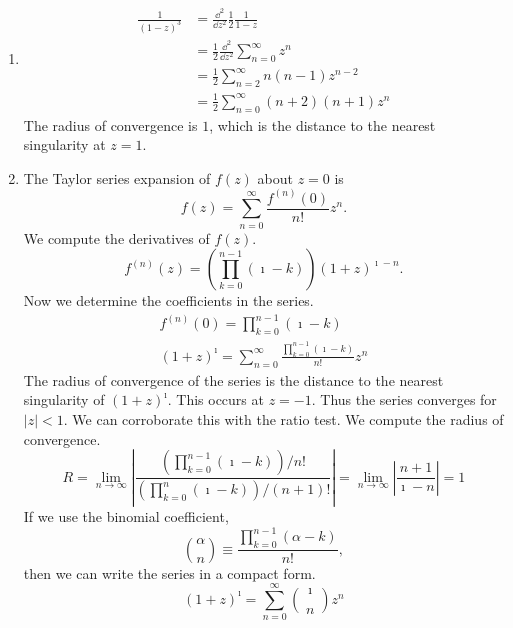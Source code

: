 {\begin{Solution}
\begin{enumerate}
\[    \]
    The Taylor series converges uniformly on any closed sub-domain of 
    $|z - z_0| < R$.  We consider the sub-domain $|z - z_0| \leq \rho < R$.
    On the domain of uniform convergence we can interchange differentiation 
    and summation.
    \begin{gather*}
      f'(z) = \frac{\dd}{\dd z} \sum_{n = 0}^\infty \frac{ f^{(n)}(z_0) z^n }{ n! }
      \\
      f'(z) = \sum_{n = 1}^\infty \frac{ n f^{(n)}(z_0) z^{n-1} }{ n! }
      \\
      f'(z) = \sum_{n = 0}^\infty \frac{ f^{(n+1)}(z_0) z^n }{ n! }
    \end{gather*}
    Note that this is the Taylor series that we could obtain directly for 
    $f'(z)$.  Since $f(z)$ is analytic on $|z - z_0| < R$ so is $f'(z)$.
    \[
    f'(z) = \sum_{n = 0}^\infty \frac{ f^{(n+1)}(z_0) z^n }{ n! }
    \]
  \item 
    \begin{align*}
      \frac{1}{(1 - z)^3}
      &= \frac{\dd^2}{\dd z^2} \frac{1}{2} \frac{1}{1-z}
      \\
      &= \frac{1}{2} \frac{\dd^2}{\dd z^2} \sum_{n = 0}^\infty z^n
      \\
      &= \frac{1}{2} \sum_{n = 2}^\infty n (n-1) z^{n-2}
      \\
      &= \frac{1}{2} \sum_{n = 0}^\infty (n + 2) (n + 1) z^n
    \end{align*}
    The radius of convergence is $1$, which is the distance to the nearest 
    singularity at $z = 1$.
  \item 
    The Taylor series expansion of $f(z)$ about $z = 0$ is
    \[
    f(z) = \sum_{n = 0}^\infty \frac{f^{(n)}(0)}{n!} z^n.
    \]
    We compute the derivatives of $f(z)$.
    \[
    f^{(n)}(z) = \left( \prod_{k = 0}^{n-1} (\imath - k) \right) (1 + z)^{\imath - n}.
    \]
    Now we determine the coefficients in the series.
    \begin{gather*}
      f^{(n)}(0) = \prod_{k = 0}^{n-1} (\imath - k)
      \\
      (1 + z)^\imath = \sum_{n = 0}^\infty \frac{ \prod_{k = 0}^{n-1} (\imath - k) }{ n! } z^n
    \end{gather*}
    The radius of convergence of the series is the distance to the nearest 
    singularity of $(1 + z)^\imath$.  This occurs at $z = -1$.  Thus the 
    series converges for $|z| < 1$.  We can corroborate this with the 
    ratio test.  We compute the radius of convergence.
    \[
    R = \lim_{n \to \infty} \left| 
      \frac{ \left( \prod_{k = 0}^{n-1} (\imath - k)\right) / n! }
      { \left( \prod_{k = 0}^n (\imath - k) \right) / (n+1)! } \right|
    = \lim_{n \to \infty} \left| \frac{ n + 1 }{ \imath - n } \right|
    = 1
    \]
    If we use the binomial coefficient,
    \[
    \binom{\alpha}{n} \equiv \frac{ \prod_{k = 0}^{n-1} (\alpha - k) }{ n! },
    \]
    then we can write the series in a compact form.
    \[
    \boxed{
      (1 + z)^\imath = \sum_{n = 0}^\infty \binom{\imath}{n} z^n
    }
    \]
  \end{enumerate}
\end{Solution}



}
